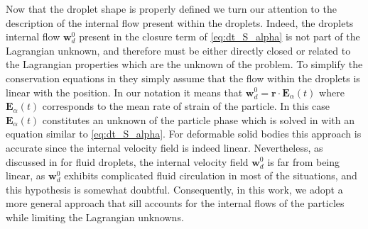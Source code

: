 Now that the droplet shape is properly defined we turn our attention to the description of the internal flow present within the droplets.
Indeed, the droplets internal flow $\textbf{w}_d^0$ present in the closure term of \ref{eq:dt_S_alpha} is not part of the Lagrangian unknown, and therefore must be either directly closed or related to the Lagrangian properties which are the unknown of the problem.  
To simplify the conservation equations in \citet{lhuillier1987phenomenology} they simply assume that the flow within the droplets is linear with the position. 
In our notation it means that $\textbf{w}_d^0 = \textbf{r}\cdot \textbf{E}_\alpha(t)$ where $\textbf{E}_\alpha(t)$ corresponds to the mean rate of strain of the particle. 
In this case $\textbf{E}_\alpha(t)$ constitutes an unknown of the particle phase which is solved in \citet{lhuillier1987phenomenology} with an equation similar to \ref{eq:dt_S_alpha}. 
For deformable solid bodies this approach is accurate since the internal velocity field is indeed linear.
Nevertheless, as discussed in \citet{lhuillier1987phenomenology} for fluid droplets, the internal velocity field $\textbf{w}_d^0$ is far from being linear, as $\textbf{w}_d^0$ exhibits complicated fluid circulation in most of the situations, and this hypothesis is somewhat doubtful. 
Consequently, in this work, we adopt a more general approach that sill accounts for the internal flows of the particles while limiting the Lagrangian unknowns.

